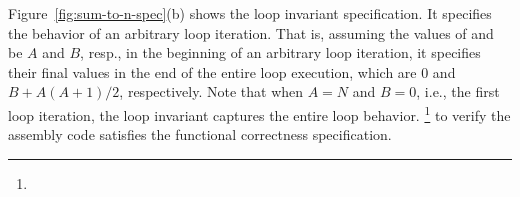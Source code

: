 Figure~\ref{fig:sum-to-n-spec}(b) shows the loop invariant specification.
It specifies the behavior of an arbitrary loop iteration.
That is, assuming the values of  and  be $A$ and $B$, resp., in the beginning of an arbitrary loop iteration, it specifies their final values in the end of the entire loop execution, which are 0 and $B + A(A+1)/2$, respectively.
Note that when $A = N$ and $B = 0$, i.e., the first loop iteration, the loop invariant captures the entire loop behavior.
%
%
\footnote{%
} to verify the  assembly code satisfies the functional correctness specification.




